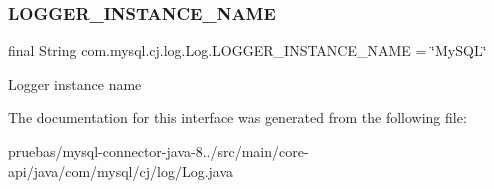 \subsubsection{\texorpdfstring{L\+O\+G\+G\+E\+R\+\_\+\+I\+N\+S\+T\+A\+N\+C\+E\+\_\+\+N\+A\+ME}{LOGGER\_INSTANCE\_NAME}}
{\footnotesize\ttfamily final String com.\+mysql.\+cj.\+log.\+Log.\+L\+O\+G\+G\+E\+R\+\_\+\+I\+N\+S\+T\+A\+N\+C\+E\+\_\+\+N\+A\+ME = \char`\"{}My\+S\+QL\char`\"{}\hspace{0.3cm}{\ttfamily [static]}}

Logger instance name 

The documentation for this interface was generated from the following file\+:\begin{DoxyCompactItemize}
\item 
pruebas/mysql-\/connector-\/java-\/8../src/main/core-\/api/java/com/mysql/cj/log/Log.\+java\end{DoxyCompactItemize}
